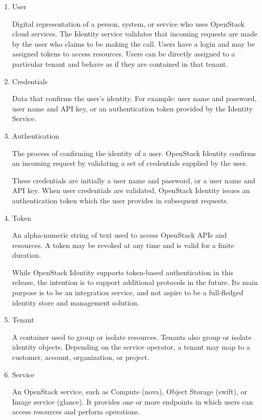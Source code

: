    \begin{enumerate}
        \item User
        \par Digital representation of a person, system, or service who uses OpenStack cloud services. The Identity service validates that incoming requests are made by the user who claims to be making the call. Users have a login and may be assigned tokens to access resources. Users can be directly assigned to a particular tenant and behave as if they are contained in that tenant.

        \item Credentials
        \par Data that confirms the user's identity. For example: user name and password, user name and API key, or an authentication token provided by the Identity Service.

        \item Authentication
        \par The process of confirming the identity of a user. OpenStack Identity confirms an incoming request by validating a set of credentials supplied by the user.
        
        \par These credentials are initially a user name and password, or a user name and API key. When user credentials are validated, OpenStack Identity issues an authentication token which the user provides in subsequent requests.
        
        \item Token
        \par An alpha-numeric string of text used to access OpenStack APIs and resources. A token may be revoked at any time and is valid for a finite duration.
        
        \par While OpenStack Identity supports token-based authentication in this release, the intention is to support additional protocols in the future. Its main purpose is to be an integration service, and not aspire to be a full-fledged identity store and management solution.
        
        \item Tenant
        \par A container used to group or isolate resources. Tenants also group or isolate identity objects. Depending on the service operator, a tenant may map to a customer, account, organization, or project.
        
        \item Service
        \par An OpenStack service, such as Compute (nova), Object Storage (swift), or Image service (glance). It provides one or more endpoints in which users can access resources and perform operations.
        

\end{enumerate}
